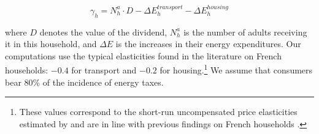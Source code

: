 \documentclass[12pt]{article} %
\begin{document}
\vspace{-0.4cm} %

\begin{equation}
\label{eq:formula_net_gain}
    \gamma_h = N^a_h \cdot D - \Delta E^{transport}_h - \Delta E^{housing}_h
\end{equation}

\noindent
where $D$ denotes the value of the dividend, $N^a_h$ is the number of adults receiving it in this household, and $\Delta E$ is the increases in their energy expenditures. Our computations use the typical elasticities found in the literature on French households: $-0.4$ for transport and $-0.2$ for housing.\footnote{These values correspond to the short-run uncompensated price elasticities estimated by \citet{douenne_2020} and are in line with previous findings on French households \citep[e.g.,][]{clerc_marcus,bureau_distributional_2011}.}  We assume that consumers bear 80\% of the incidence of energy taxes.


\end{document}
